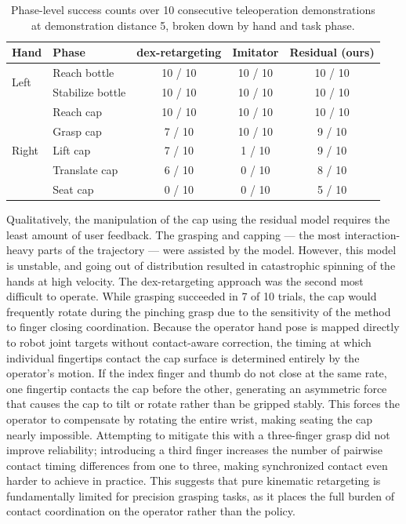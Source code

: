 \begin{table}[H]
    \centering
    \begin{tabular}{llccc}
        \toprule
        \textbf{Hand} & \textbf{Phase} & \textbf{dex-retargeting} & \textbf{Imitator} & \textbf{Residual (ours)} \\
        \midrule
        \multirow{2}{*}{Left}
            & Reach bottle       & 10 / 10 & 10 / 10 & 10 / 10 \\
            & Stabilize bottle   & 10 / 10 & 10 / 10 & 10 / 10 \\
        \midrule
        \multirow{5}{*}{Right}
            & Reach cap          & 10 / 10 & 10 / 10 & 10 / 10 \\
            & Grasp cap          &  7 / 10 & 10 / 10 &  9 / 10 \\
            & Lift cap           &  7 / 10 &  1 / 10 &  9 / 10 \\
            & Translate cap      &  6 / 10 &  0 / 10 &  8 / 10 \\
            & Seat cap           &  0 / 10 &  0 / 10 &  5 / 10 \\
        \bottomrule
    \end{tabular}
    \caption{Phase-level success counts over 10 consecutive teleoperation demonstrations at demonstration distance 5, broken down by hand and task phase.}
    \label{tab:online_teleop_success}
\end{table}

Qualitatively, the manipulation of the cap using the residual model requires the least amount of user feedback. The grasping and capping --- the most interaction-heavy parts of the trajectory --- were assisted by the model. However, this model is unstable, and going out of distribution resulted in catastrophic spinning of the hands at high velocity. The dex-retargeting approach was the second most difficult to operate. While grasping succeeded in 7 of 10 trials, the cap would frequently rotate during the pinching grasp due to the sensitivity of the method to finger closing coordination. Because the operator hand pose is mapped directly to robot joint targets without contact-aware correction, the timing at which individual fingertips contact the cap surface is determined entirely by the operator's motion. If the index finger and thumb do not close at the same rate, one fingertip contacts the cap before the other, generating an asymmetric force that causes the cap to tilt or rotate rather than be gripped stably. This forces the operator to compensate by rotating the entire wrist, making seating the cap nearly impossible. Attempting to mitigate this with a three-finger grasp did not improve reliability; introducing a third finger increases the number of pairwise contact timing
differences from one to three, making synchronized contact even harder to achieve in practice. This suggests that pure kinematic retargeting is fundamentally limited for precision grasping tasks, as it places the full burden of contact coordination on the operator rather than the policy.

